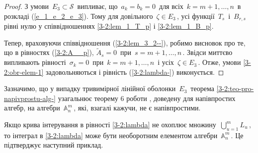 \documentclass[11pt, reqno]{amsart}
\begin{document}
\begin{proof} 
З умови\, $E_3\subset \mathcal{S}$\, випливає, що\, $a_k=b_k=0$\, для всіх\, $k=m+1,\ldots,n$\,
в розкладі (\ref{e_1_e_2_e_3}).
Тому для довільного\, $\zeta\in E_3$\,, усі функції\, $T_s$\, і\, $B_{r,s}$\, рівні нулю
у співвідношеннях \eqref{3-2:lem_1_T_p} і \eqref{3-2:lem_1_B_p}.

Тепер, враховуючи співвідношення (\ref{3-2:lem_3_2--}), робимо висновок про те, що в рівностях (\ref{3-2:A__p}),
$\widetilde{A}_s=0$\, при\, $s=m+1,\ldots,n$\,. Звідси миттєво випливають рівності\,
$\sigma_k=0$\, при\, $k=m+1,\ldots,n$\, і усіх\, $\zeta\in E_3$\,.
Отже, умови \eqref{3-2:obr-elem-1} задовольняються і рівність (\ref{3-2:lambda-}) виконується.
\end{proof}

\vskip 1mm

Зазначимо, що у випадку тривимірної лінійної оболонки\, $E_3$\,
теорема \ref{3-2:teo-pro-napivprostu-alg-} узагальнює теорему 6
роботи \cite{Pukh-5}, доведену для напівпростих алгебр, на алгебри\, $\mathbb{A}_n^m$\,, які, взагалі кажучи,
не є напівпростими.


Якщо крива інтерування в рівності \eqref{3-2:lambda} не охоплює множину\, $\bigcup\limits_{u=1}^m L_u$\,,
то інтеграл в \eqref{3-2:lambda} може бути необоротним елементом алгебри\, $\mathbb{A}_n^m$\,.
Це підтверджує наступний приклад.
\end{document}
